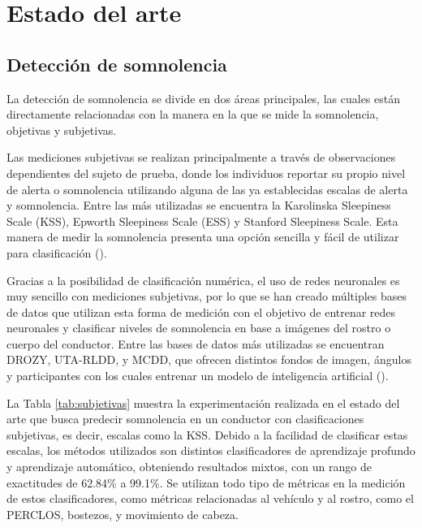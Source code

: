 %
\chapter{Estado del arte}
\label{ch::capitulo2}

\section{Detección de somnolencia}
La detección de somnolencia se divide en dos áreas principales, las cuales están directamente relacionadas con la manera en la que se mide la somnolencia, objetivas y subjetivas.

Las mediciones subjetivas se realizan principalmente a través de observaciones dependientes del sujeto de prueba, donde los individuos reportar su propio nivel de alerta o somnolencia utilizando alguna de las ya establecidas escalas de alerta y somnolencia. Entre las más utilizadas se encuentra la Karolinska Sleepiness Scale (KSS), Epworth Sleepiness Scale (ESS) y Stanford Sleepiness Scale. Esta manera de medir la somnolencia presenta una opción sencilla y fácil de utilizar para clasificación (\cite{osamaSubyObj}). 

Gracias a la posibilidad de clasificación numérica, el uso de redes neuronales es muy sencillo con mediciones subjetivas, por lo que se han creado múltiples bases de datos que utilizan esta forma de medición con el objetivo de entrenar redes neuronales y clasificar niveles de somnolencia en base a imágenes del rostro o cuerpo del conductor. Entre las bases de datos más utilizadas se encuentran DROZY, UTA-RLDD, y MCDD, que ofrecen distintos fondos de imagen, ángulos y participantes con los cuales entrenar un modelo de inteligencia artificial (\cite{DrowsyDG}).

La Tabla \ref{tab:subjetivas} muestra la experimentación realizada en el estado del arte que busca predecir somnolencia en un conductor con clasificaciones subjetivas, es decir, escalas como la KSS. Debido a la facilidad de clasificar estas escalas, los métodos utilizados son distintos clasificadores de aprendizaje profundo y aprendizaje automático, obteniendo resultados mixtos, con un rango de exactitudes de 62.84\% a 99.1\%. Se utilizan todo tipo de métricas en la medición de estos clasificadores, como métricas relacionadas al vehículo y al rostro, como el PERCLOS, bostezos, y movimiento de cabeza. 

